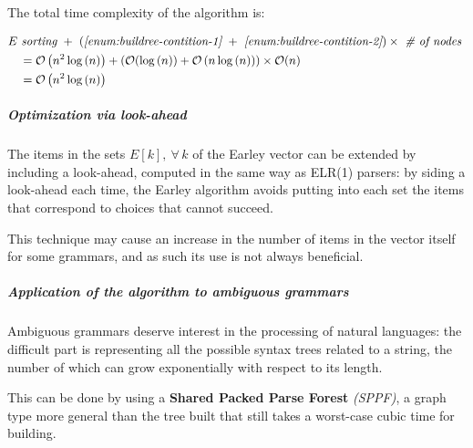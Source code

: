 The total time complexity of the algorithm is:

\begin{align*}
   & E \ \textit{sorting} \ + \ \left(\textit{\ref{enum:buildree-contition-1}} \ + \ \textit{\ref{enum:buildree-contition-2}} \right) \times \ \textit{\# of nodes} \ \\
   & \quad = \mathcal{O}\left( n^2 \log{(n)} \right) + \left( \mathcal{O}(\log{(n)}) + \mathcal{O}\left( n \log{(n)} \right) \right) \times \mathcal{O}(n)            \\
   & \quad = \mathcal{O}\left( n^2 \log{(n)} \right)
\end{align*}

\subparagraph*{Optimization via look-ahead}

The items in the sets \(E[k], \ \forall \, k\) of the Earley vector can be extended by including a look-ahead, computed in the same way as ELR(1) parsers:
by siding a look-ahead each time, the Earley algorithm avoids putting into each set the items that correspond to choices that cannot succeed.

This technique may cause an increase in the number of items in the vector itself for some grammars, and as such its use is not always beneficial.

\subparagraph*{Application of the algorithm to ambiguous grammars}

Ambiguous grammars deserve interest in the processing of natural languages:
the difficult part is representing all the possible syntax trees related to a string, the number of which can grow exponentially with respect to its length.

This can be done by using a \textbf{Shared Packed Parse Forest} \textit{(SPPF)}, a graph type more general than the tree built that still takes a worst-case cubic time for building.






























































